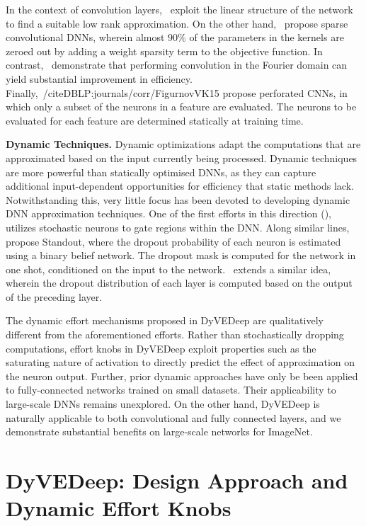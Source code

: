 \documentclass{article} %
\begin{document}
In the context of convolution layers,~\cite{DBLP:journals/corr/DentonZBLF14,DBLP:conf/bmvc/JaderbergVZ14} exploit the linear structure of the network to find a suitable low rank approximation. On the other hand,~\cite{DBLP:conf/cvpr/LiuWFTP15} propose sparse convolutional DNNs, wherein almost $90\%$ of the parameters in the kernels are zeroed out by adding a weight sparsity term to the objective function. In contrast,~\cite{DBLP:journals/corr/MathieuHL13} demonstrate that performing convolution in the Fourier domain can yield substantial improvement in efficiency. Finally,~/cite{DBLP:journals/corr/FigurnovVK15} propose perforated CNNs, in which only a subset of the neurons in a feature are evaluated. The neurons to be evaluated for each feature are determined statically at training time. 

{\bf \noindent Dynamic Techniques.} Dynamic optimizations adapt the computations that are approximated based on the input currently being processed. Dynamic techniques are more powerful than statically optimised DNNs, as they can capture additional input-dependent opportunities for efficiency that static methods lack. Notwithstanding this, very little focus has been devoted to developing dynamic DNN approximation techniques. One of the first efforts in this direction (\cite{DBLP:journals/corr/abs-1305-2982}), utilizes stochastic neurons to gate regions within the DNN. Along similar lines,~\cite{DBLP:conf/nips/BaF13} propose Standout, where the dropout probability of each neuron is estimated using a binary belief network. The dropout mask is computed for the network in one shot, conditioned on the input to the network.~\cite{DBLP:journals/corr/BengioBPP15} extends a similar idea, wherein the dropout distribution of each layer is computed based on the output of the preceding layer. 

The dynamic effort mechanisms proposed in DyVEDeep are qualitatively different from the aforementioned efforts. Rather than stochastically dropping computations, effort knobs in DyVEDeep exploit properties such as the saturating nature of activation to directly predict the effect of approximation on the neuron output. Further, prior dynamic approaches have only be been applied to fully-connected networks trained on small datasets. Their applicability to large-scale DNNs remains unexplored. On the other hand, DyVEDeep is naturally applicable to both convolutional and fully connected layers, and we demonstrate substantial benefits on large-scale networks for ImageNet.

\section{DyVEDeep: Design Approach and Dynamic Effort Knobs} \label{sec:dyvedeepApproach}
\end{document}
